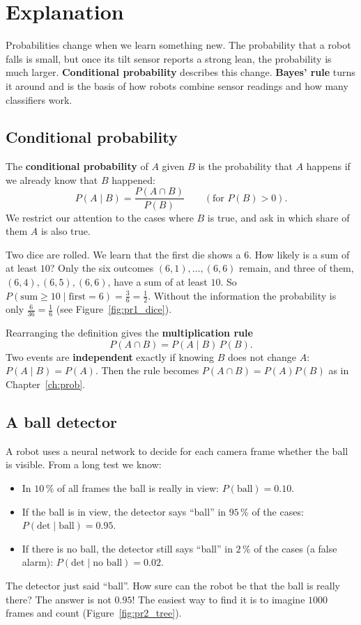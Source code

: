 \label{ch:cond}

\section*{Explanation}
Probabilities change when we learn something new. The probability that a robot falls is small, but once its tilt sensor reports a strong lean, the probability is much larger. \textbf{Conditional probability} describes this change. \textbf{Bayes' rule} turns it around and is the basis of how robots combine sensor readings and how many classifiers work.

\subsection*{Conditional probability}
The \textbf{conditional probability} of $A$ given $B$ is the probability that $A$ happens if we already know that $B$ happened:
\[
P(A\mid B)=\frac{P(A\cap B)}{P(B)}\qquad(\text{for }P(B)>0).
\]
We restrict our attention to the cases where $B$ is true, and ask in which share of them $A$ is also true.

\begin{example}
Two dice are rolled. We learn that the first die shows a $6$. How likely is a sum of at least $10$? Only the six outcomes $(6,1),\dots,(6,6)$ remain, and three of them, $(6,4),(6,5),(6,6)$, have a sum of at least $10$. So $P(\text{sum}\ge10\mid\text{first}=6)=\frac36=\frac12$. Without the information the probability is only $\frac6{36}=\frac16$ (see Figure~\ref{fig:pr1_dice}).
\end{example}

Rearranging the definition gives the \textbf{multiplication rule}
\[
P(A\cap B)=P(A\mid B)\,P(B).
\]
Two events are \textbf{independent} exactly if knowing $B$ does not change $A$: $P(A\mid B)=P(A)$. Then the rule becomes $P(A\cap B)=P(A)P(B)$ as in Chapter~\ref{ch:prob}.

\subsection*{A ball detector}
A robot uses a neural network to decide for each camera frame whether the ball is visible. From a long test we know:
\begin{itemize}[nosep]
  \item In $10\,\%$ of all frames the ball is really in view: $P(\text{ball})=0.10$.
  \item If the ball is in view, the detector says ``ball'' in $95\,\%$ of the cases: $P(\text{det}\mid\text{ball})=0.95$.
  \item If there is no ball, the detector still says ``ball'' in $2\,\%$ of the cases (a false alarm): $P(\text{det}\mid\text{no ball})=0.02$.
\end{itemize}
The detector just said ``ball''. How sure can the robot be that the ball is really there? The answer is not $0.95$! The easiest way to find it is to imagine $1000$ frames and count (Figure~\ref{fig:pr2_tree}).

